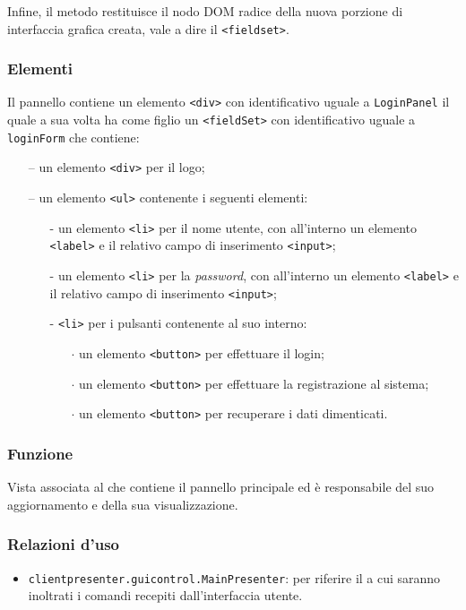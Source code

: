 \begin{description}
Infine, il metodo restituisce il nodo DOM radice della nuova porzione di interfaccia grafica creata, vale a dire il \verb'<fieldset>'.

\end{description}

\subsubsection*{Elementi}
Il pannello contiene un elemento \verb'<div>' con identificativo uguale a \verb'LoginPanel' il quale a sua volta ha come figlio un \verb'<fieldSet>' con identificativo uguale a \verb'loginForm' che contiene:
  \begin{itemize}
    \item[--] un elemento \verb'<div>' per il logo;
    \item[--] un elemento \verb'<ul>' contenente i seguenti elementi:
    \begin{itemize}
      \item[-] un elemento \verb'<li>' per il nome utente, con all'interno un elemento \verb'<label>' e il relativo campo di inserimento \verb'<input>';
      \item[-] un elemento \verb'<li>' per la \textit{password}, con all'interno un elemento \verb'<label>' e il relativo campo di inserimento \verb'<input>';
      \item[-] \verb'<li>' per i pulsanti contenente al suo interno:
      \begin{itemize}
        \item[$\cdot$] un elemento \verb'<button>' per effettuare il login;
        \item[$\cdot$] un elemento \verb'<button>' per effettuare la registrazione al sistema;
        \item[$\cdot$] un elemento \verb'<button>' per recuperare i dati dimenticati.
      \end{itemize}
    \end{itemize}
  \end{itemize}
  

\subsubsection*{Funzione}
Vista associata al  che contiene il pannello principale ed è responsabile del suo aggiornamento e della sua visualizzazione.

\subsubsection*{Relazioni d'uso}
\begin{itemize}
  \item \texttt{clientpresenter.guicontrol.MainPresenter}: per riferire il  a cui saranno inoltrati i comandi recepiti dall'interfaccia utente.
\end{itemize}

